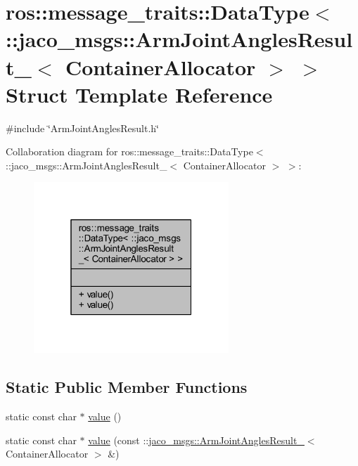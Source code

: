 \hypertarget{structros_1_1message__traits_1_1DataType_3_01_1_1jaco__msgs_1_1ArmJointAnglesResult___3_01ContainerAllocator_01_4_01_4}{}\section{ros\+:\+:message\+\_\+traits\+:\+:Data\+Type$<$ \+:\+:jaco\+\_\+msgs\+:\+:Arm\+Joint\+Angles\+Result\+\_\+$<$ Container\+Allocator $>$ $>$ Struct Template Reference}
\label{structros_1_1message__traits_1_1DataType_3_01_1_1jaco__msgs_1_1ArmJointAnglesResult___3_01ContainerAllocator_01_4_01_4}


{\ttfamily \#include \char`\"{}Arm\+Joint\+Angles\+Result.\+h\char`\"{}}



Collaboration diagram for ros\+:\+:message\+\_\+traits\+:\+:Data\+Type$<$ \+:\+:jaco\+\_\+msgs\+:\+:Arm\+Joint\+Angles\+Result\+\_\+$<$ Container\+Allocator $>$ $>$\+:
\nopagebreak
\begin{figure}[H]
\begin{center}
\leavevmode
\includegraphics[width=208pt]{d8/d60/structros_1_1message__traits_1_1DataType_3_01_1_1jaco__msgs_1_1ArmJointAnglesResult___3_01Contai9ac2e0f0e982f183faaef34a653ff2eb}
\end{center}
\end{figure}
\subsection*{Static Public Member Functions}
\begin{DoxyCompactItemize}
\item 
static const char $\ast$ \hyperlink{structros_1_1message__traits_1_1DataType_3_01_1_1jaco__msgs_1_1ArmJointAnglesResult___3_01ContainerAllocator_01_4_01_4_a356077b5cbe5c77a553376792e4ac0c6}{value} ()
\item 
static const char $\ast$ \hyperlink{structros_1_1message__traits_1_1DataType_3_01_1_1jaco__msgs_1_1ArmJointAnglesResult___3_01ContainerAllocator_01_4_01_4_ac8c39e90f00662c24d2b7f0755aa221d}{value} (const \+::\hyperlink{structjaco__msgs_1_1ArmJointAnglesResult__}{jaco\+\_\+msgs\+::\+Arm\+Joint\+Angles\+Result\+\_\+}$<$ Container\+Allocator $>$ \&)
\end{DoxyCompactItemize}


